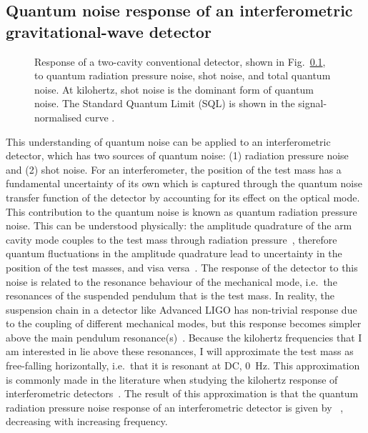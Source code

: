 

\subsection{Quantum noise response of an interferometric gravitational-wave detector}


\begin{figure}
	\centering
	\caption{Response of a two-cavity conventional detector, shown in Fig.~\ref{}, to quantum radiation pressure noise, shot noise, and total quantum noise. At kilohertz, shot noise is the dominant form of quantum noise. The Standard Quantum Limit (SQL) is shown in the signal-normalised curve .}
	\label{fig:simplifed_QN_response_conventional}
\end{figure}

This understanding of quantum noise can be applied to an interferometric detector, which has two sources of quantum noise: (1) radiation pressure noise and (2) shot noise. 
For an interferometer, the position of the test mass has a fundamental uncertainty of its own which is captured through the quantum noise transfer function of the detector by accounting for its effect on the optical mode. This contribution to the quantum noise is known as quantum radiation pressure noise. 
This can be understood physically: the amplitude quadrature of the arm cavity mode couples to the test mass through radiation pressure~\cite{}, therefore quantum fluctuations in the amplitude quadrature lead to uncertainty in the position of the test masses, and visa versa~\cite{Danilishin?}. The response of the detector to this noise is related to the resonance behaviour of the mechanical mode, i.e.\ the resonances of the suspended pendulum that is the test mass. In reality, the suspension chain in a detector like Advanced LIGO has non-trivial response due to the coupling of different mechanical modes, but this response becomes simpler above the main pendulum resonance(s)~\cite{}. Because the kilohertz frequencies that I am interested in lie above these resonances, I will approximate the test mass as free-falling horizontally, i.e.\ that it is resonant at DC, $0$~Hz. This approximation is commonly made in the literature when studying the kilohertz response of interferometric detectors~\cite{}. The result of this approximation is that the quantum radiation pressure noise response of an interferometric detector is given by ~\cite{}, decreasing with increasing frequency.

